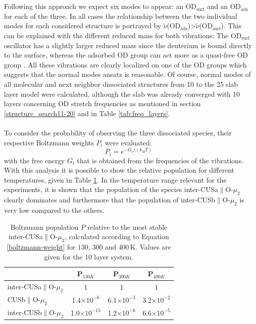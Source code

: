 \documentclass[11pt,DIV=13,BCOR=5mm,a4paper,headinclude]{scrbook}
\begin{document}
\\\\
 Following this approach we expect six modes to appear: an OD$_\textrm{surf}$ and an OD$_\textrm{ads}$ for each of the three.
In all cases the relationship between the two individual modes for each considered structure is portrayed by $\tilde{\nu}$(OD$_\textrm{ads}$)>$\tilde{\nu}$(OD$_\textrm{surf}$).
This can be explained with the different reduced mass for both vibrations: The OD$_\textrm{surf}$ oscillator has a slightly larger reduced mass since the deuterium is bound directly to the surface, whereas the adsorbed OD group can act more as a quasi-free OD group \cite{Wirth2014}.
All these vibrations are clearly localized on one of the OD groups which suggests that the normal modes ansatz is reasonable.
Of course, normal modes of all molecular and next neighbor dissociated structures from 10 to the 25 slab layer model were calculated, although the slab was already converged with 10 layers concerning OD stretch frequencies as mentioned in section \ref{structure_search11-20} and in Table \ref{tab:freq_layers}. 
\\
\\
To consider the probability of observing the three dissociated species, their respective Boltzmann weights $P_i$ were evaluated:
\begin{equation}\label{boltzmann-weight}
 P_i=e^{-G_i/(k_BT)}
\end{equation}
with the free energy $G_i$ that is obtained from the frequencies of the vibrations.
With this analysis it is possible to show the relative population for different temperatures, given in Table \ref{tab:boltzmann-pop}.
In the temperature range relevant for the experiments, it is shown that the population of the species inter-CUSa$\parallel$O-$\mu_2$ clearly dominates and furthermore that the population of inter-CUSb$\parallel$O-$\mu_2$ is very low compared to the others.
\begin{table}[th]
  \centering
 \caption{Boltzmann population $P$ relative to the most stable inter-CUSa$\parallel$O-$\mu_2$, calculated according to Equation \ref{boltzmann-weight} for $130$, $300$ and $400\,$K.
Values are given for the 10 layer system.}
\vspace*{.2cm} 
 \begin{tabular}{l|ccc}
 \toprule
  & P$_{130K}$ & P$_{300K}$ & P$_{400K}$\\\midrule
  inter-CUSa$\parallel$O-$\mu_2$ &1 &1 &1 \\
  CUSb$\parallel$O-$\mu_2$ & 1.4$\times 10^{-6}$& 6.1$\times 10^{-3}$& 3.2$\times 10^{-2}$\\
  inter-CUSb$\parallel$O-$\mu_2$ & 1.0$\times 10^{-15}$ & 1.2$\times 10^{-6}$ & 6.6$\times 10^{-5}$\\\bottomrule
  \end{tabular} 
  \label{tab:boltzmann-pop}
\end{table}
\end{document}
